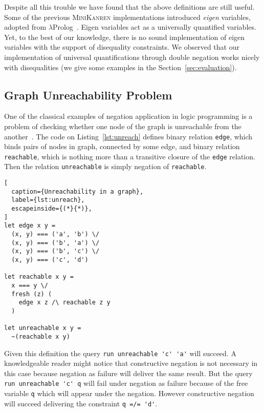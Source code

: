 Despite all this trouble we have found that 
the above definitions are still useful.
Some of the previous \textsc{MiniKanren} implementations 
introduced \emph{eigen} variables,
adopted from $\lambda$Prolog~\cite{miller2012programming}.
Eigen variables act as a universally quantified variables.
Yet, to the best of our knowledge,
there is no sound implementation of eigen variables
with the support of disequality constraints.
We observed that our implementation 
of universal quantifications through double negation 
works nicely with disequalities 
(we give some examples in the Section~\ref{sec:evaluation}).
 
\subsection{Graph Unreachability Problem}

One of the classical examples of negation application 
in logic programming is a problem of checking whether 
one node of the graph is unreachable 
from the another~\cite{przymusinski1989constructive}.
The code on Listing~\ref{lst:unreach}
defines binary relation \lstinline{edge},
which binds pairs of nodes in graph, 
connected by some edge,
and binary relation \lstinline{reachable},
which is nothing more than a 
transitive closure of the \lstinline{edge} relation.
Then the relation \lstinline{unreachable}
is simply negation of \lstinline{reachable}.

\begin{minipage}[h]{\textwidth}
\begin{lstlisting}[
  caption={Unreachability in a graph},
  label={lst:unreach},
  escapeinside={(*}{*)},
]
let edge x y = 
  (x, y) === ('a', 'b') \/
  (x, y) === ('b', 'a') \/
  (x, y) === ('b', 'c') \/
  (x, y) === ('c', 'd') 

let reachable x y = 
  x === y \/
  fresh (z) (
    edge x z /\ reachable z y
  )

let unreachable x y = 
  ~(reachable x y)
\end{lstlisting}
\end{minipage}

Given this definition the query \lstinline{run unreachable 'c' 'a'} will succeed.
A knowledgeable reader might notice that 
constructive negation is not necessary in this case 
because negation as failure will deliver the same result.
But the query \lstinline{run unreachable 'c' q} will fail under
negation as failure because of the free variable \lstinline{q} which 
will appear under the negation.
However constructive negation will succeed 
delivering the constraint \lstinline{q =/= 'd'}.

